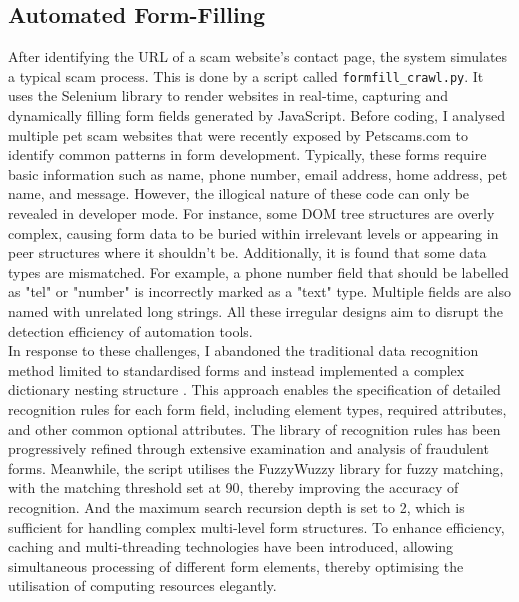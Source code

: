 \documentclass[ oneside,%
                    author={Cassie Qing Tang},
                    degree={BSc},
                     title={An Automated Response System for Disrupting Online Pet Scamming \\ },
                    subtitle={ }]{dissertation}
\begin{document}
\subsection{Automated Form-Filling}
After identifying the URL of a scam website's contact page, the system simulates a typical scam process. This is done by a script called \texttt{formfill\_crawl.py}. It uses the Selenium library to render websites in real-time, capturing and dynamically filling form fields generated by JavaScript. Before coding, I analysed multiple pet scam websites that were recently exposed by Petscams.com to identify common patterns in form development. Typically, these forms require basic information such as name, phone number, email address, home address, pet name, and message. However, the illogical nature of these code can only be revealed in developer mode. For instance, some DOM tree structures are overly complex, causing form data to be buried within irrelevant levels or appearing in peer structures where it shouldn't be. Additionally, it is found that some data types are mismatched. For example, a phone number field that should be labelled as "tel" or "number" is incorrectly marked as a "text" type. Multiple fields are also named with unrelated long strings. All these irregular designs aim to disrupt the detection efficiency of automation tools.
\\

In response to these challenges, I abandoned the traditional data recognition method limited to standardised forms and instead implemented a complex dictionary nesting structure \cite{noauthor_python_2023}. This approach enables the specification of detailed recognition rules for each form field, including element types, required attributes, and other common optional attributes. The library of recognition rules has been progressively refined through extensive examination and analysis of fraudulent forms. Meanwhile, the script utilises the FuzzyWuzzy library for fuzzy matching, with the matching threshold set at 90, thereby improving the accuracy of recognition. And the maximum search recursion depth is set to 2, which is sufficient for handling complex multi-level form structures. To enhance efficiency, caching and multi-threading technologies have been introduced, allowing simultaneous processing of different form elements, thereby optimising the utilisation of computing resources elegantly.
\\
\end{document}
